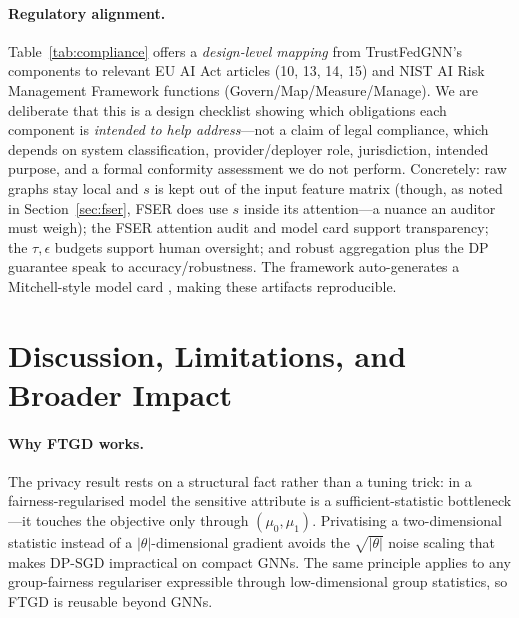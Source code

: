 \documentclass[pdflatex,sn-mathphys-num]{sn-jnl}
\theoremstyle{thmstyleone}%
\theoremstyle{thmstyletwo}%
\theoremstyle{thmstylethree}%
\begin{document}
\paragraph{Regulatory alignment.}
Table~\ref{tab:compliance} offers a \emph{design-level mapping} from
TrustFedGNN's components to relevant EU AI Act articles (10, 13, 14, 15) and NIST
AI Risk Management Framework functions (Govern/Map/Measure/Manage). We are
deliberate that this is a design checklist showing which obligations each
component is \emph{intended to help address}---not a claim of legal compliance,
which depends on system classification, provider/deployer role, jurisdiction,
intended purpose, and a formal conformity assessment we do not perform. Concretely:
raw graphs stay local and $s$ is kept out of the input feature matrix (though, as
noted in Section~\ref{sec:fser}, FSER does use $s$ inside its attention---a
nuance an auditor must weigh); the FSER attention audit and model card support
transparency; the $\tau,\epsilon$ budgets support human oversight; and robust
aggregation plus the DP guarantee speak to accuracy/robustness. The framework
auto-generates a Mitchell-style model card \cite{mitchell2019model}, making these
artifacts reproducible.

\begin{table}[t]\centering\small
\caption{Mapping of TrustFedGNN components to EU AI Act articles and NIST AI RMF
functions.}
\label{tab:compliance}

\end{table}

\section{Discussion, Limitations, and Broader Impact}
\label{sec:discussion}

\paragraph{Why FTGD works.}
The privacy result rests on a structural fact rather than a tuning trick: in a
fairness-regularised model the sensitive attribute is a sufficient-statistic
bottleneck---it touches the objective only through $(\mu_0,\mu_1)$. Privatising
a two-dimensional statistic instead of a $|\theta|$-dimensional gradient avoids
the $\sqrt{|\theta|}$ noise scaling that makes DP-SGD impractical on compact
GNNs. The same principle applies to any group-fairness regulariser expressible
through low-dimensional group statistics, so FTGD is reusable beyond GNNs.
\end{document}

